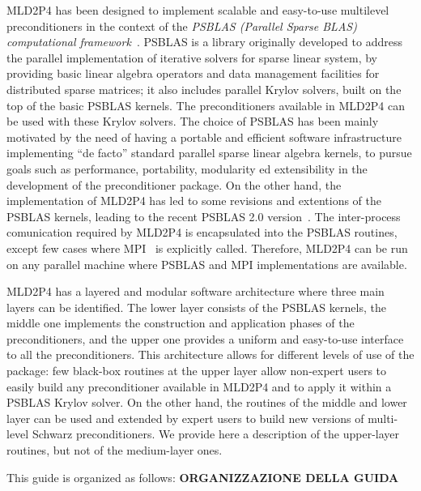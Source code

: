MLD2P4 has been designed to implement scalable and easy-to-use multilevel preconditioners
in the context of the \emph{PSBLAS (Parallel Sparse BLAS)
  computational framework}~\cite{psblas_00}. 
PSBLAS is a library originally developed to address the parallel implementation of
iterative solvers for sparse linear system, by providing basic linear algebra
operators and data management facilities for distributed sparse matrices; it
also includes parallel Krylov solvers, built on the top of the basic PSBLAS kernels.
The preconditioners available in MLD2P4 can be used with these Krylov solvers.
The choice of PSBLAS has been mainly motivated by the need of having
a portable and efficient software infrastructure implementing ``de facto'' standard
parallel sparse linear algebra kernels, to pursue goals such as performance,
portability, modularity ed extensibility in the development of the preconditioner
package. On the other hand, the implementation of MLD2P4 has led to some
revisions and extentions of the PSBLAS kernels, leading to the
recent PSBLAS 2.0 version~\cite{PSBLASGUIDE}. The inter-process comunication required
by MLD2P4 is encapsulated into the PSBLAS routines, except few cases where
MPI~\cite{MPI1} is explicitly called. Therefore, MLD2P4 can be run on any parallel
machine where PSBLAS and MPI implementations are available.

MLD2P4 has a layered and modular software architecture where three main layers can be identified. 
The lower layer consists of the PSBLAS kernels, the middle one implements
the construction and application phases of the preconditioners, and the upper one
provides a uniform and easy-to-use interface to all the preconditioners. 
This architecture allows for different levels of use of the package:
few black-box routines at the upper layer allow non-expert users to easily
build any preconditioner available in MLD2P4 and to apply it within a PSBLAS Krylov solver.
On the other hand, the routines of the middle and lower layer can be used and extended
by expert users to build new versions of multi-level Schwarz preconditioners.
We provide here a description of the upper-layer routines, but not of the
medium-layer ones.

This guide is organized as follows: \textbf{ORGANIZZAZIONE DELLA GUIDA}

